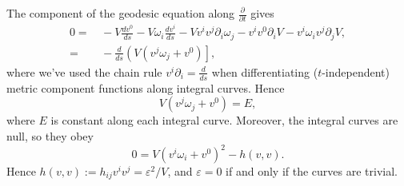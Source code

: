 \documentclass[12pt]{amsart}
\numberwithin{equation}{section}
\begin{document}
The component of the geodesic equation along $\frac{\partial}{\partial t}$ gives
\begin{equation}
\label{eqA.4}
\begin{split}
0=&\, -V\frac{dv^0}{ds}-V\omega_i\frac{dv^i}{ds}-Vv^iv^j\partial_i\omega_j-v^iv^0\partial_iV -v^i\omega_iv^j\partial_jV,\\
=&\, -\frac{d}{ds}\left ( V \left ( v^j\omega_j +v^0\right ) \right ],
\end{split}
\end{equation}
where we've used the chain rule $v^i \partial_i=\frac{d}{ds}$ when differentiating ($t$-independent) metric component functions along integral curves. Hence
\begin{equation}
\label{eqA.5}
V \left ( v^j\omega_j +v^0\right )=E,
\end{equation}
where $E$ is constant along each integral curve. Moreover, the integral curves are null, so they obey
\begin{equation}
\label{eqA.6}
0=V\left ( v^i\omega_i+v^0\right )^2-h(v,v).
\end{equation}
Hence $h(v,v):=h_{ij}v^iv^j=\varepsilon^2/V$, and $\varepsilon =0$ if and only if the curves are trivial.
\end{document}
